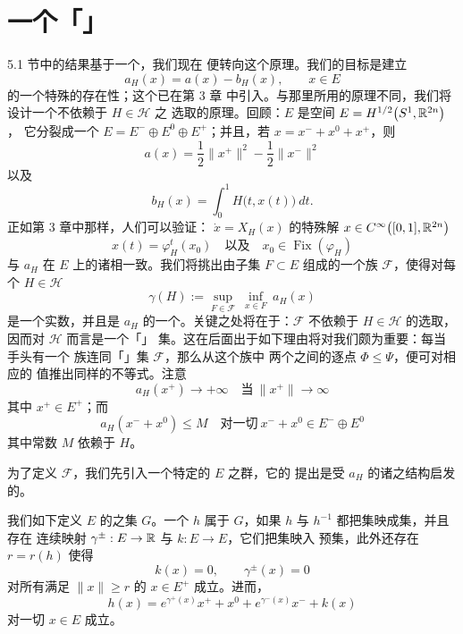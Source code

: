 
\section{一个「\trUniversal」\trVariationalPrinciple}
\label{sec:universal-variational-principle}
%
%
%

5.1 节中的结果基于一个\trVariationalPrinciple，我们现在%
便转向这个原理。我们的目标是建立\trActionFunctional
\[
a_{H}(x)=a(x)-b_{H}(x),\qquad x\in E
\]
的一个特殊\trCriticalPoint{}的存在性；这个\trActionFunctional{}已在第 3 章%
中引入。与那里所用的原理不同，我们将设计一个不依赖于 $H\in\mathcal{H}$ 之%
选取的\trMinimax{}原理。回顾：$E$ 是\trHilbert{}空间 $E=H^{1/2}\bigl(S^{1},\mathbb{R}^{2n}\bigr)$，%
它分裂成一个\trOrthogonalSum{} $E=E^{-}\oplus E^{0}\oplus E^{+}$；并且，若%
$x=x^{-}+x^{0}+x^{+}$，则
\[
a(x)=\frac{1}{2}\bigl\lVert x^{+}\bigr\rVert^{2}-\frac{1}{2}\bigl\lVert x^{-}\bigr\rVert^{2}
\]
以及
\[
b_{H}(x)=\int_{0}^{1}H\bigl(t,x(t)\bigr)\ dt.
\]
正如第 3 章中那样，人们可以验证：\trHamiltonianEquation{} $\dot{x}=X_{H}(x)$%
的特殊解 $x\in C^{\infty}\bigl([0,1],\mathbb{R}^{2n}\bigr)$
\[
x(t)=\varphi_{H}^{t}(x_{0})\quad\text{以及}\quad x_{0}\in\operatorname{Fix}(\varphi_{H})
\]
与 $a_{H}$ 在 $E$ 上的诸\trCriticalPoint{}相一致。我们将挑出由子集 $F\subset E$%
组成的一个族 $\mathcal{F}$，使得对每个 $H\in\mathcal{H}$
\[
\gamma(H):=\sup_{F\in\mathcal{F}}\ \inf_{x\in F}\ a_{H}(x)
\]
是一个实数，并且是 $a_{H}$ 的一个\trCriticalValue。关键之处将在于：$\mathcal{F}$%
不依赖于 $H\in\mathcal{H}$ 的选取，因而对 $\mathcal{H}$ 而言是一个「\trUniversal」%
\trMinimax{}集。这在后面出于如下理由将对我们颇为重要：每当手头有一个%
\trFunctional{}族连同「\trUniversal」\trMinimax{}集 $\mathcal{F}$，那么从这个族中%
两个\trFunctional{}之间的逐点\trEstimate{} $\Phi\leq\Psi$，便可对相应的%
\trMinimax{}值推出同样的不等式。注意
\[
a_{H}(x^{+})\to+\infty\quad\text{当}\ \lVert x^{+}\rVert\to\infty
\]
其中 $x^{+}\in E^{+}$；而
\[
a_{H}(x^{-}+x^{0})\leq M\quad\text{对一切}\ x^{-}+x^{0}\in E^{-}\oplus E^{0}
\]
其中常数 $M$ 依赖于 $H$。

为了定义 $\mathcal{F}$，我们先引入一个特定的 $E$ 之\trHomeomorphism{}群，它的%
提出是受 $a_{H}$ 的诸\trGradient\trFlow{}之结构启发的。

\begin{definition}\label{def:homeomorphism-group-G}
我们如下定义 $E$ 的\trHomeomorphism{}之集 $G$。一个\trHomeomorphism{} $h$%
属于 $G$，如果 $h$ 与 $h^{-1}$ 都把\trBounded{}集映成\trBounded{}集，并且存在%
连续映射 $\gamma^{\pm}:E\to\mathbb{R}$ 与 $k:E\to E$，它们把\trBounded{}集映入%
预\trCompact{}集，此外还存在 $r=r(h)$ 使得
\[
k(x)=0,\qquad\gamma^{\pm}(x)=0
\]
对所有满足 $\lVert x\rVert\geq r$ 的 $x\in E^{+}$ 成立。进而，
\[
h(x)=e^{\gamma^{+}(x)}x^{+}+x^{0}+e^{\gamma^{-}(x)}x^{-}+k(x)
\]
对一切 $x\in E$ 成立。
\end{definition}

